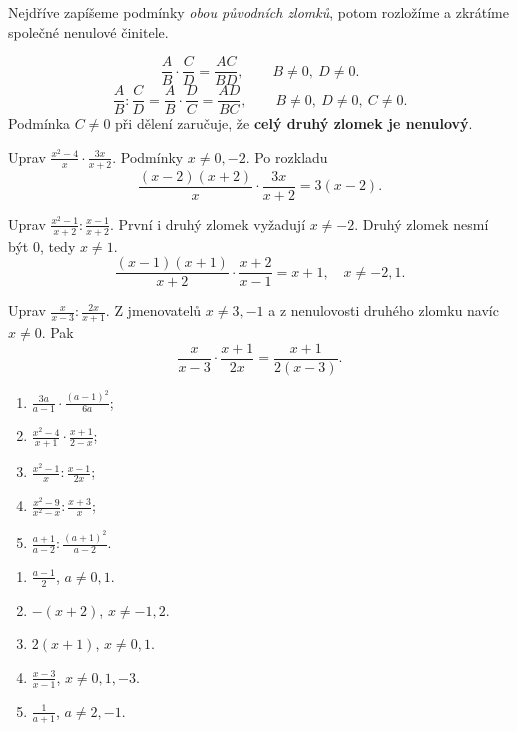 \documentclass[11pt,a4paper]{article}
\begin{document}
Nejdříve zapíšeme podmínky \emph{obou původních zlomků}, potom rozložíme a zkrátíme společné nenulové činitele.
\begin{zadaniBox}[title={Věta - Násobení a dělení lomených výrazů}]
\[\frac AB\cdot\frac CD=\frac{AC}{BD},\qquad B\ne0,\ D\ne0.\]
\[\frac AB:\frac CD=\frac AB\cdot\frac DC=\frac{AD}{BC},\qquad B\ne0,\ D\ne0,\ C\ne0.\]
Podmínka $C\ne0$ při dělení zaručuje, že \textbf{celý druhý zlomek je nenulový}.
\end{zadaniBox}
\begin{prikladReseniBox}[breakable=false,title={Příklad 1}]
Uprav $\displaystyle\frac{x^2-4}{x}\cdot\frac{3x}{x+2}$.
\tcblower
Podmínky $x\ne0,-2$. Po rozkladu
\[\frac{(x-2)(x+2)}x\cdot\frac{3x}{x+2}=3(x-2).\]
\end{prikladReseniBox}
\begin{prikladReseniBox}[breakable=false,title={Příklad 2}]
Uprav $\displaystyle\frac{x^2-1}{x+2}:\frac{x-1}{x+2}$.
\tcblower
První i druhý zlomek vyžadují $x\ne-2$. Druhý zlomek nesmí být $0$, tedy $x\ne1$.
\[\frac{(x-1)(x+1)}{x+2}\cdot\frac{x+2}{x-1}=x+1,\quad x\ne-2,1.\]
\end{prikladReseniBox}
\begin{prikladReseniBox}[breakable=false,title={Příklad 3}]
Uprav $\displaystyle\frac{x}{x-3}:\frac{2x}{x+1}$.
\tcblower
Z jmenovatelů $x\ne3,-1$ a z nenulovosti druhého zlomku navíc $x\ne0$. Pak
\[\frac{x}{x-3}\cdot\frac{x+1}{2x}=\frac{x+1}{2(x-3)}.\]
\end{prikladReseniBox}
\begin{zadaniReseniBox}[breakable=false,title={Samostatná práce 1}]
\begin{enumerate}[label=\alph*)]
\item $\frac{3a}{a-1}\cdot\frac{(a-1)^2}{6a}$;
\item $\frac{x^2-4}{x+1}\cdot\frac{x+1}{2-x}$;
\item $\frac{x^2-1}{x}:\frac{x-1}{2x}$;
\item $\frac{x^2-9}{x^2-x}:\frac{x+3}{x}$;
\item $\frac{a+1}{a-2}:\frac{(a+1)^2}{a-2}$.
\end{enumerate}
\tcblower
\begin{enumerate}[label=\alph*)]
\item $\frac{a-1}{2}$, $a\ne0,1$.
\item $-(x+2)$, $x\ne-1,2$.
\item $2(x+1)$, $x\ne0,1$.
\item $\frac{x-3}{x-1}$, $x\ne0,1,-3$.
\item $\frac1{a+1}$, $a\ne2,-1$.
\end{enumerate}
\end{zadaniReseniBox}
\end{document}
